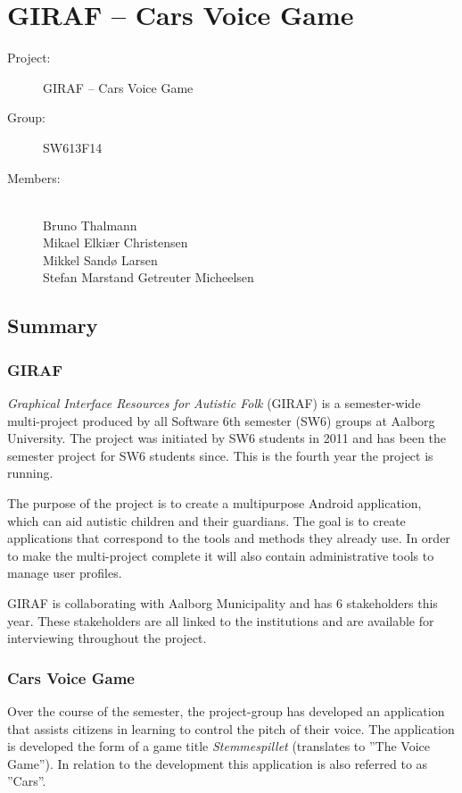 \documentclass[a4paper,12pt,english]{article}
\begin{document}
\section*{GIRAF -- Cars Voice Game}

\begin{description}
\item[Project:] GIRAF -- Cars Voice Game
\item[Group:] SW613F14
\item[Members:] ~ \\
	Bruno Thalmann \\
	Mikael Elki\ae r Christensen \\
	Mikkel Sand\o{} Larsen \\
	Stefan Marstand Getreuter Micheelsen
\end{description}

\subsection*{Summary}

\subsubsection*{GIRAF}
\textit{Graphical Interface Resources for Autistic Folk} (GIRAF) is a semester-wide multi-project produced by all Software 6th semester (SW6) groups at Aalborg University.
The project was initiated by SW6 students in 2011 and has been the semester project for SW6 students since.
This is the fourth year the project is running.

The purpose of the project is to create a multipurpose Android application, which can aid autistic children and their guardians.
The goal is to create applications that correspond to the tools and methods they already use.
In order to make the multi-project complete it will also contain administrative tools to manage user profiles.

GIRAF is collaborating with Aalborg Municipality and has 6 stakeholders this year.
These stakeholders are all linked to the institutions and are available for interviewing throughout the project.

\subsubsection*{Cars Voice Game}
Over the course of the semester, the project-group has developed an application that assists citizens in learning to control the pitch of their voice.
The application is developed the form of a game title \textit{Stemmespillet} (translates to ''The Voice Game'').
In relation to the development this application is also referred to as ''Cars''.
\end{document}
